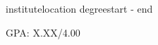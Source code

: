 \resumeSubheading
{{institute}}{{location}}
{{degree}}{{start} - {end}}
\resumeItemListStart
\item GPA: X.XX/4.00
\resumeItemListEnd